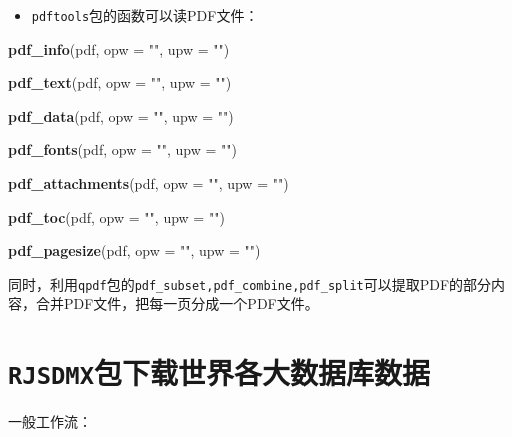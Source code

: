 \documentclass[
]{book}
\newenvironment{Shaded}{\begin{snugshade}}{\end{snugshade}}
\newcommand{\DataTypeTok}[1]{\textcolor[rgb]{0.13,0.29,0.53}{#1}}
\newcommand{\KeywordTok}[1]{\textcolor[rgb]{0.13,0.29,0.53}{\textbf{#1}}}
\newcommand{\NormalTok}[1]{#1}
\newcommand{\StringTok}[1]{\textcolor[rgb]{0.31,0.60,0.02}{#1}}
\providecommand{\tightlist}{%
  \setlength{\itemsep}{0pt}\setlength{\parskip}{0pt}}
\begin{document}
\begin{itemize}
\tightlist
\item
  \texttt{pdftools}包的函数可以读PDF文件：
\end{itemize}

\begin{Shaded}
\begin{Highlighting}[]
\KeywordTok{pdf_info}\NormalTok{(pdf, }\DataTypeTok{opw =} \StringTok{""}\NormalTok{, }\DataTypeTok{upw =} \StringTok{""}\NormalTok{)}

\KeywordTok{pdf_text}\NormalTok{(pdf, }\DataTypeTok{opw =} \StringTok{""}\NormalTok{, }\DataTypeTok{upw =} \StringTok{""}\NormalTok{)}

\KeywordTok{pdf_data}\NormalTok{(pdf, }\DataTypeTok{opw =} \StringTok{""}\NormalTok{, }\DataTypeTok{upw =} \StringTok{""}\NormalTok{)}

\KeywordTok{pdf_fonts}\NormalTok{(pdf, }\DataTypeTok{opw =} \StringTok{""}\NormalTok{, }\DataTypeTok{upw =} \StringTok{""}\NormalTok{)}

\KeywordTok{pdf_attachments}\NormalTok{(pdf, }\DataTypeTok{opw =} \StringTok{""}\NormalTok{, }\DataTypeTok{upw =} \StringTok{""}\NormalTok{)}

\KeywordTok{pdf_toc}\NormalTok{(pdf, }\DataTypeTok{opw =} \StringTok{""}\NormalTok{, }\DataTypeTok{upw =} \StringTok{""}\NormalTok{)}

\KeywordTok{pdf_pagesize}\NormalTok{(pdf, }\DataTypeTok{opw =} \StringTok{""}\NormalTok{, }\DataTypeTok{upw =} \StringTok{""}\NormalTok{)}
\end{Highlighting}
\end{Shaded}

同时，利用\texttt{qpdf}包的\texttt{pdf\_subset,pdf\_combine,pdf\_split}可以提取PDF的部分内容，合并PDF文件，把每一页分成一个PDF文件。

\hypertarget{rjsdmxux5305ux4e0bux8f7dux4e16ux754cux5404ux5927ux6570ux636eux5e93ux6570ux636e}{%
\section{\texorpdfstring{\texttt{RJSDMX}包下载世界各大数据库数据}{RJSDMX包下载世界各大数据库数据}}\label{rjsdmxux5305ux4e0bux8f7dux4e16ux754cux5404ux5927ux6570ux636eux5e93ux6570ux636e}}

一般工作流：
\end{document}
